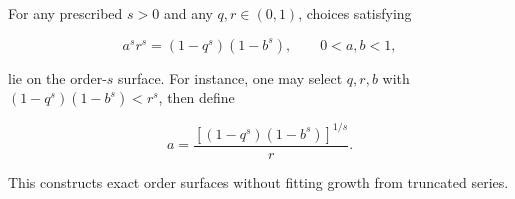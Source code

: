 For any prescribed \(s>0\) and any \(q,r\in(0,1)\), choices satisfying

\[
a^s r^s=(1-q^s)(1-b^s),\qquad 0<a,b<1,
\]

lie on the order-\(s\) surface. For instance, one may select \(q,r,b\)
with \((1-q^s)(1-b^s)<r^s\), then define

\[
a=\frac{[(1-q^s)(1-b^s)]^{1/s}}{r}.
\]

This constructs exact order surfaces without fitting growth from
truncated series.

